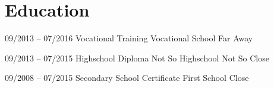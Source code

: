 \documentclass[9pt]{saiba-cv}
\begin{document}
{\begin{minipage}[c][\textheight][t]{0.748\textwidth}

    \section*{Education}
    \entry
      {09/2013 -- 07/2016}
      {Vocational Training}
      {Vocational School}
      {Far Away}
      {\lorem}

    \entry
      {09/2013 -- 07/2015}
      {Highschool Diploma}
      {Not So Highschool}
      {Not So Close}
      {\lorem}

    \entry
      {09/2008 -- 07/2015}
      {Secondary School Certificate}
      {First School}
      {Close}
      {\lorem}

  \end{minipage}
}%
\end{document}
